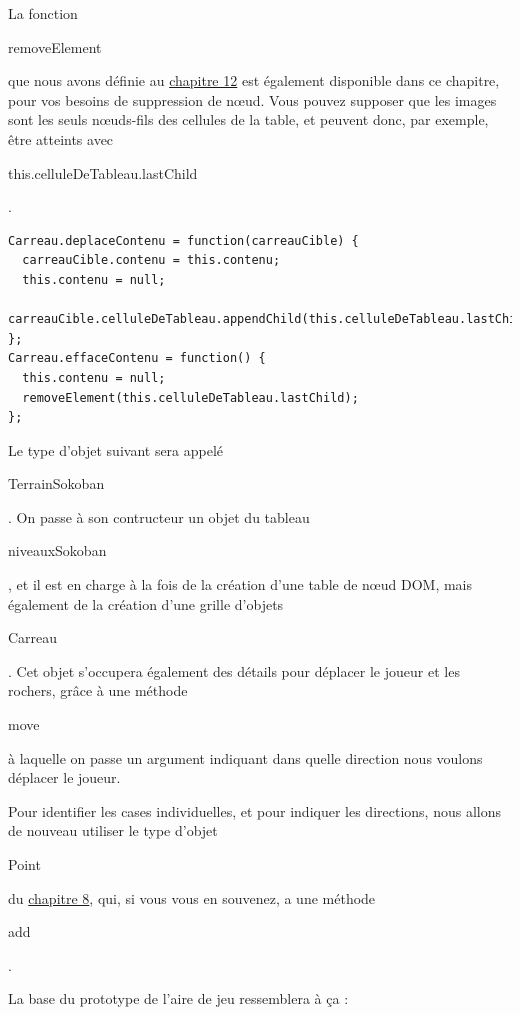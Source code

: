 \documentclass{FramateX}
\renewcommand{\texttt}[1]{\begin{sffamily}{#1}\end{sffamily}}
\begin{document}
La fonction \texttt{removeElement} que nous avons définie au
\href{chapter12.html}{chapitre 12} est également disponible dans ce
chapitre, pour vos besoins de suppression de nœud. Vous pouvez supposer
que les images sont les seuls nœuds-fils des cellules de la table, et
peuvent donc, par exemple, être atteints avec
\texttt{this.celluleDeTableau.lastChild}.

\begin{lstlisting}
Carreau.deplaceContenu = function(carreauCible) {
  carreauCible.contenu = this.contenu;
  this.contenu = null;
  carreauCible.celluleDeTableau.appendChild(this.celluleDeTableau.lastChild);
};
Carreau.effaceContenu = function() {
  this.contenu = null;
  removeElement(this.celluleDeTableau.lastChild);
};
\end{lstlisting}
\begin{center}\end{center}

Le type d'objet suivant sera appelé \texttt{TerrainSokoban}. On passe à
son contructeur un objet du tableau \texttt{niveauxSokoban}, et il est
en charge à la fois de la création d'une table de nœud DOM, mais
également de la création d'une grille d'objets \texttt{Carreau}. Cet
objet s'occupera également des détails pour déplacer le joueur et les
rochers, grâce à une méthode \texttt{move} à laquelle on passe un
argument indiquant dans quelle direction nous voulons déplacer le
joueur.

Pour identifier les cases individuelles, et pour indiquer les
directions, nous allons de nouveau utiliser le type d'objet
\texttt{Point} du \href{chapter8.html}{chapitre 8}, qui, si vous vous en
souvenez, a une méthode \texttt{add}.

La base du prototype de l'aire de jeu ressemblera à ça :
\end{document}
